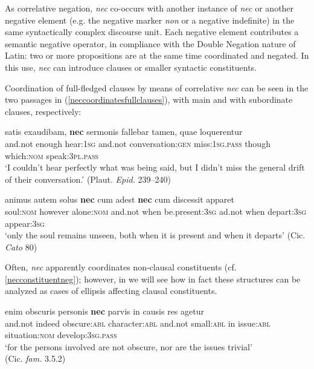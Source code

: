 \documentclass[output=paper,modfonts,nonflat,citecolor=brown,
showindex
]{langsci/langscibook}
\begin{document}
As correlative negation, {\emph{nec}} co-occurs with another instance of {\emph{nec}} or another negative element (e.g. the negative marker {\emph{non}} or a negative indefinite) in the same syntactically complex discourse unit. Each negative element contributes a semantic negative operator, in compliance with the Double Negation nature of Latin: two or more propositions are at the same time coordinated and negated. In this use, {\emph{nec}} can introduce clauses or smaller syntactic constituents.

Coordination of full-fledged clauses by means of correlative {\emph{nec}} can be seen in the two passages in (\ref{neccoordinatesfullclauses}), with main and with subordinate clauses, respectively:

{\begin{exe}
\ex \label{neccoordinatesfullclauses}
\begin{xlist}
\ex {} satis exaudibam, {\textbf{nec}} sermonis fallebar tamen, quae loquerentur\\
and.not enough hear:{\textsc{1sg}} and.not conversation:{\textsc{gen}} miss:{\textsc{1sg.pass}} though which:{\textsc{nom}} speak:{\textsc{3pl.pass}} \\

`I couldn't hear perfectly what was being said, but I didn't miss the general drift of their conversation.' (Plaut. {\emph{Epid.}} 239--240)

\ex \gll animus autem solus {\textbf{nec}} cum adest {\textbf{nec}} cum discessit apparet\\
soul:{\textsc{nom}} however alone:{\textsc{nom}} and.not when be.present:{\textsc{3sg}} ad.not when depart:{\textsc{3sg}} appear:{\textsc{3sg}}\\

`only the soul remains unseen, both when it is present and when it departs' (Cic. {\emph{Cato}} 80)
\end{xlist}
\end{exe}}


\noindent Often, {\emph{nec}} apparently coordinates non-clausal constituents (cf. \ref{necconstituentneg}); however, in  we will see how in fact these structures can be analyzed as cases of ellipsis affecting clausal constituents.

{\begin{exe}
\ex \label{necconstituentneg}  enim obscuris personis {\textbf{nec}} parvis in causis res agetur\\
and.not indeed obscure:{\textsc{abl}} character:{\textsc{abl}} and.not small:{\textsc{abl}} in issue:{\textsc{abl}} situation:{\textsc{nom}} develop:{\textsc{3sg.pass}}\\

`for the persons involved are not obscure, nor are the issues trivial'\\(Cic. {\emph{fam.}} 3.5.2)
\end{exe}}
\end{document}
